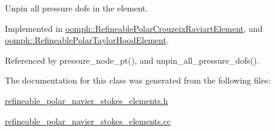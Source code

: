 Unpin all pressure dofs in the element. 



Implemented in \hyperlink{classoomph_1_1RefineablePolarCrouzeixRaviartElement_a672ed3b75ac6408eda52c6789a1c9690}{oomph\+::\+Refineable\+Polar\+Crouzeix\+Raviart\+Element}, and \hyperlink{classoomph_1_1RefineablePolarTaylorHoodElement_a08d48de7b56b5412b8e7c5269381b18d}{oomph\+::\+Refineable\+Polar\+Taylor\+Hood\+Element}.



Referenced by pressure\+\_\+node\+\_\+pt(), and unpin\+\_\+all\+\_\+pressure\+\_\+dofs().



The documentation for this class was generated from the following files\+:\begin{DoxyCompactItemize}
\item 
\hyperlink{refineable__polar__navier__stokes__elements_8h}{refineable\+\_\+polar\+\_\+navier\+\_\+stokes\+\_\+elements.\+h}\item 
\hyperlink{refineable__polar__navier__stokes__elements_8cc}{refineable\+\_\+polar\+\_\+navier\+\_\+stokes\+\_\+elements.\+cc}\end{DoxyCompactItemize}
